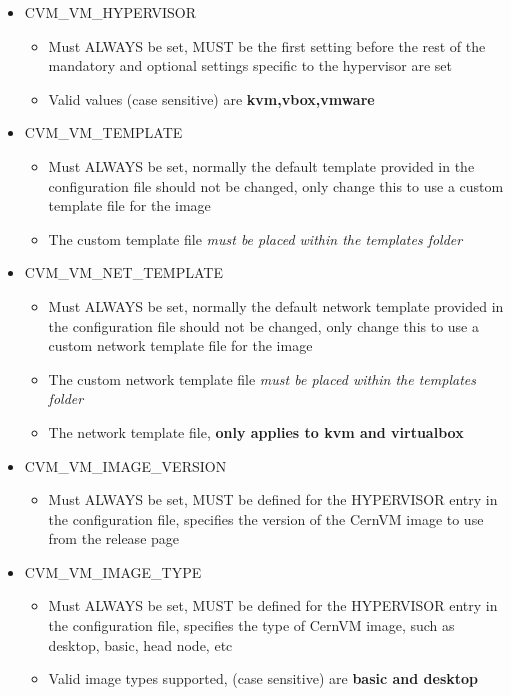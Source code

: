 \begin{itemize}
\item	CVM\_VM\_HYPERVISOR
		\begin{itemize}
		\item	Must ALWAYS be set, MUST be the first setting before the rest of the mandatory
	  			and optional settings specific to the hypervisor are set
	  	\item	Valid values (case sensitive) are {\bf kvm,vbox,vmware}
		\end{itemize}

\item	CVM\_VM\_TEMPLATE
		\begin{itemize}
		\item	Must ALWAYS be set, normally the default template provided in the configuration file
				should not be changed, only change this to use a custom template file for the \cernvm 
				image
		\item	The custom template file \emph{must be placed within the templates folder}
		\end{itemize}

\item	CVM\_VM\_NET\_TEMPLATE
		\begin{itemize}
		\item	Must ALWAYS be set, normally the default network template provided in the configuration file
				should not be changed, only change this to use a custom network template file for the \cernvm 
				image
		\item	The custom network template file \emph{must be placed within the templates folder}
		\item 	The network template file, {\bf only applies to kvm and virtualbox}
		\end{itemize}

\item	CVM\_VM\_IMAGE\_VERSION
		\begin{itemize}
		\item	Must ALWAYS be set,  MUST be defined for the HYPERVISOR entry in the configuration
				file, specifies the version of the CernVM image to use from the release page
		\end{itemize}
	
\item	CVM\_VM\_IMAGE\_TYPE
		\begin{itemize}
		\item	Must ALWAYS be set,  MUST be defined for the HYPERVISOR entry in the configuration
				file, specifies the type of CernVM image, such as desktop, basic, head node, etc
		\item	Valid image types supported, (case sensitive) are {\bf basic and desktop}
		\end{itemize}
		

\end{itemize}
